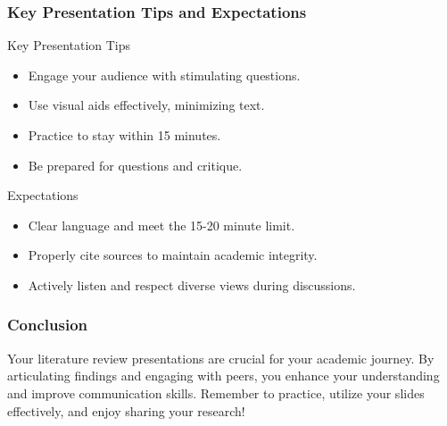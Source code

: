 \documentclass[aspectratio=169]{beamer}
\begin{document}
\begin{frame}[fragile]
    \frametitle{Key Presentation Tips and Expectations}
    \begin{block}{Key Presentation Tips}
        \begin{itemize}
            \item Engage your audience with stimulating questions.
            \item Use visual aids effectively, minimizing text.
            \item Practice to stay within 15 minutes.
            \item Be prepared for questions and critique.
        \end{itemize}
    \end{block}

    \begin{block}{Expectations}
        \begin{itemize}
            \item Clear language and meet the 15-20 minute limit.
            \item Properly cite sources to maintain academic integrity.
            \item Actively listen and respect diverse views during discussions.
        \end{itemize}
    \end{block}
\end{frame}

\begin{frame}[fragile]
    \frametitle{Conclusion}
    Your literature review presentations are crucial for your academic journey. 
    By articulating findings and engaging with peers, you enhance your understanding and improve communication skills. 
    Remember to practice, utilize your slides effectively, and enjoy sharing your research!
\end{frame}
\end{document}
